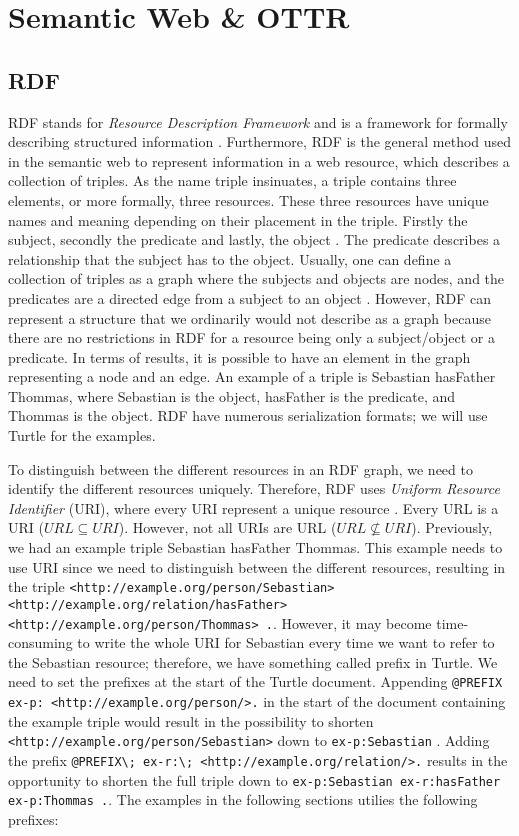 
\chapter{Semantic Web \& OTTR}

\section{RDF}
\label{rdf}
RDF \autocite{W3C_RDF} stands for \emph{Resource Description Framework} and is a framework for formally describing structured information \autocite[19]{FOSWT}. Furthermore, RDF is the general method used in the semantic web to represent information in a web resource, which describes a collection of triples. As the name triple insinuates, a triple contains three elements, or more formally, three resources. These three resources have unique names and meaning depending on their placement in the triple. Firstly the subject, secondly the predicate and lastly, the object \autocite{W3C_RDF}. The predicate describes a relationship that the subject has to the object. Usually, one can define a collection of triples as a graph where the subjects and objects are nodes, and the predicates are a directed edge from a subject to an object \autocite{W3C_RDF}. However, RDF can represent a structure that we ordinarily would not describe as a graph because there are no restrictions in RDF for a resource being only a subject/object or a predicate. In terms of results, it is possible to have an element in the graph representing a node and an edge. An example of a triple is Sebastian hasFather Thommas, where Sebastian is the object, hasFather is the predicate, and Thommas is the object. RDF have numerous serialization formats; we will use Turtle \autocite{Turtle} for the examples.  

\para
To distinguish between the different resources in an RDF graph, we need to identify the different resources uniquely. Therefore, RDF uses \emph{Uniform Resource Identifier} (URI), where every URI represent a unique resource \autocite[21-22]{FOSWT}. Every URL is a URI ($URL\subseteq URI$). However, not all URIs are URL ($URL\nsubseteq URI$).  Previously, we had an example triple Sebastian hasFather Thommas. This example needs to use URI since we need to distinguish between the different resources, resulting in the triple \lstinline{<http://example.org/person/Sebastian> <http://example.org/relation/hasFather> <http://example.org/person/Thommas> .}. However, it may become time-consuming to write the whole URI for Sebastian every time we want to refer to the Sebastian resource; therefore, we have something called prefix in Turtle. We need to set the prefixes at the start of the Turtle document. Appending \lstinline{@PREFIX ex-p: <http://example.org/person/>.} in the start of the document containing the example triple would result in the possibility to shorten \lstinline{<http://example.org/person/Sebastian>} down to \lstinline{ex-p:Sebastian} . Adding the prefix \lstinline{@PREFIX\; ex-r:\; <http://example.org/relation/>.} results in the opportunity to shorten the full triple down to \lstinline{ex-p:Sebastian ex-r:hasFather ex-p:Thommas .}. The examples in the following sections utilies the following prefixes:

